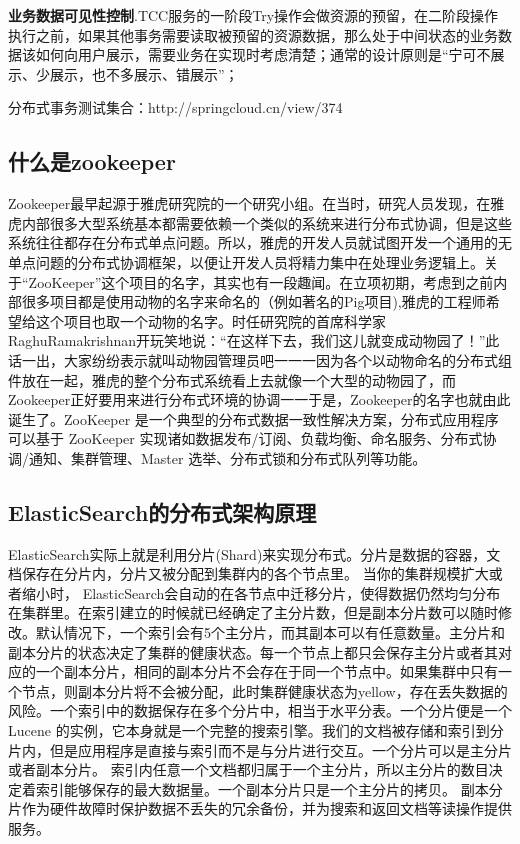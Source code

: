\documentclass[../../../interview-questions.tex]{subfiles}
\begin{document}
\textbf{业务数据可见性控制}.TCC服务的一阶段Try操作会做资源的预留，在二阶段操作执行之前，如果其他事务需要读取被预留的资源数据，那么处于中间状态的业务数据该如何向用户展示，需要业务在实现时考虑清楚；通常的设计原则是“宁可不展示、少展示，也不多展示、错展示”；

分布式事务测试集合：http://springcloud.cn/view/374



\subsection{什么是zookeeper}

Zookeeper最早起源于雅虎研究院的一个研究小组。在当时，研究人员发现，在雅虎内部很多大型系统基本都需要依赖一个类似的系统来进行分布式协调，但是这些系统往往都存在分布式单点问题。所以，雅虎的开发人员就试图开发一个通用的无单点问题的分布式协调框架，以便让开发人员将精力集中在处理业务逻辑上。关于“ZooKeeper”这个项目的名字，其实也有一段趣闻。在立项初期，考虑到之前内部很多项目都是使用动物的名字来命名的（例如著名的Pig项目),雅虎的工程师希望给这个项目也取一个动物的名字。时任研究院的首席科学家RaghuRamakrishnan开玩笑地说：“在这样下去，我们这儿就变成动物园了！”此话一出，大家纷纷表示就叫动物园管理员吧一一一因为各个以动物命名的分布式组件放在一起，雅虎的整个分布式系统看上去就像一个大型的动物园了，而Zookeeper正好要用来进行分布式环境的协调一一于是，Zookeeper的名字也就由此诞生了。ZooKeeper 是一个典型的分布式数据一致性解决方案，分布式应用程序可以基于 ZooKeeper 实现诸如数据发布/订阅、负载均衡、命名服务、分布式协调/通知、集群管理、Master 选举、分布式锁和分布式队列等功能。

\subsection{ElasticSearch的分布式架构原理}

ElasticSearch实际上就是利用分片(Shard)来实现分布式。分片是数据的容器，文档保存在分片内，分片又被分配到集群内的各个节点里。 当你的集群规模扩大或者缩小时， ElasticSearch会自动的在各节点中迁移分片，使得数据仍然均匀分布在集群里。在索引建立的时候就已经确定了主分片数，但是副本分片数可以随时修改。默认情况下，一个索引会有5个主分片，而其副本可以有任意数量。主分片和副本分片的状态决定了集群的健康状态。每一个节点上都只会保存主分片或者其对应的一个副本分片，相同的副本分片不会存在于同一个节点中。如果集群中只有一个节点，则副本分片将不会被分配，此时集群健康状态为yellow，存在丢失数据的风险。一个索引中的数据保存在多个分片中，相当于水平分表。一个分片便是一个Lucene 的实例，它本身就是一个完整的搜索引擎。我们的文档被存储和索引到分片内，但是应用程序是直接与索引而不是与分片进行交互。一个分片可以是主分片或者副本分片。 索引内任意一个文档都归属于一个主分片，所以主分片的数目决定着索引能够保存的最大数据量。一个副本分片只是一个主分片的拷贝。 副本分片作为硬件故障时保护数据不丢失的冗余备份，并为搜索和返回文档等读操作提供服务。
\end{document}
